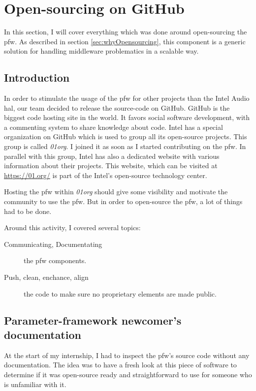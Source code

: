 \newpage


\section{Open-sourcing on GitHub}

In this section, I will cover everything which was done around open-sourcing the \gls{pfw}.
As described in section \ref{sec:whyOpensourcing}, this component is a generic solution for handling middleware problematics in
a scalable way.

\subsection{Introduction}
In order to stimulate the usage of the \gls{pfw} for other projects than the Intel Audio \gls{hal},
our team decided to release the source-code on \gls{GitHub}.
\gls{GitHub} is the biggest code hosting site in the world. It favors social software development, with a commenting system
to share knowledge about code.
Intel has a special organization on \gls{GitHub} which is used to group all its open-source projects. This group is called \emph{01org}. I
joined it as soon as I started contributing on the \gls{pfw}.
In parallel with this group, Intel has also a dedicated website with various information about their projects. This website, which can be
visited at \url{https://01.org/} is part of the Intel's open-source technology center.

Hosting the \gls{pfw} within \emph{01org} should give some visibility and motivate
the community to use the \gls{pfw}. But in order to open-source the \gls{pfw}, a lot of things had to be done.

Around this activity, I covered several topics:
\begin{description}
    \item[Communicating, Documentating] the \gls{pfw} components.
    \item[Push, clean, enchance, align] the code to make sure no proprietary
        elements are made public.
\end{description}

\subsection{Parameter-framework newcomer's documentation}\label{sec:tutorials}

At the start of my internship, I had to inspect the \gls{pfw}'s
source code without any documentation. The idea was to have a fresh look at
this piece of software to determine if it was open-source ready and straightforward
to use for someone who is unfamiliar with it.


